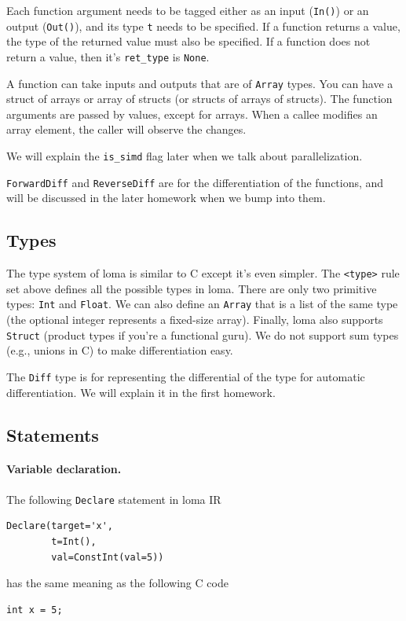 Each function argument needs to be tagged either as an input (\lstinline{In()}) or an output (\lstinline{Out()}), and its type \lstinline{t} needs to be specified. If a function returns a value, the type of the returned value must also be specified. If a function does not return a value, then it's \lstinline{ret_type} is \lstinline{None}.

A function can take inputs and outputs that are of \lstinline{Array} types. You can have a struct of arrays or array of structs (or structs of arrays of structs). The function arguments are passed by values, except for arrays. When a callee modifies an array element, the caller will observe the changes.

We will explain the \lstinline{is_simd} flag later when we talk about parallelization.

\lstinline{ForwardDiff} and \lstinline{ReverseDiff} are for the differentiation of the functions, and will be discussed in the later homework when we bump into them. 

\subsection{Types}

The type system of loma is similar to C except it's even simpler. The \lstinline{<type>} rule set above defines all the possible types in loma. There are only two primitive types: \lstinline{Int} and \lstinline{Float}. We can also define an \lstinline{Array} that is a list of the same type (the optional integer represents a fixed-size array). Finally, loma also supports \lstinline{Struct} (product types if you're a functional guru). We do not support sum types (e.g., unions in C) to make differentiation easy.

The \lstinline{Diff} type is for representing the differential of the type for automatic differentiation. We will explain it in the first homework.

\subsection{Statements}

\paragraph{Variable declaration.}
The following \lstinline{Declare} statement in loma IR
\begin{lstlisting}
Declare(target='x',
        t=Int(),
        val=ConstInt(val=5))
\end{lstlisting}
has the same meaning as the following C code
\begin{lstlisting}
int x = 5;
\end{lstlisting}

